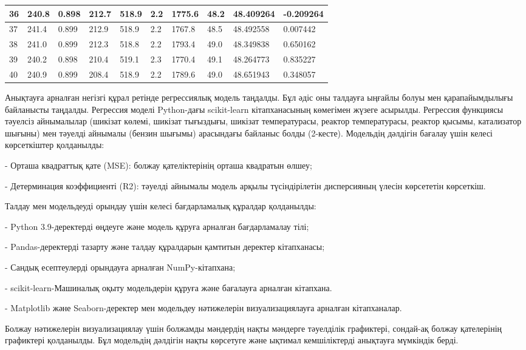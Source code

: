 \begin{longtable}[c]{|l|l|l|l|l|l|l|l|l|l|}
36 & 240.8 & 0.898 & 212.7 & 518.9 & 2.2  & 1775.6  & 48.2 & 48.409264 & -0.209264 \\ \hline
37 & 241.4 & 0.899 & 212.9 & 518.9 & 2.2  & 1767.8  & 48.5 & 48.492558 & 0.007442  \\ \hline
38 & 241.0 & 0.899 & 212.3 & 518.8 & 2.2  & 1793.4  & 49.0 & 48.349838 & 0.650162  \\ \hline
39 & 240.2 & 0.898 & 210.4 & 519.1 & 2.3  & 1770.4  & 49.1 & 48.264773 & 0.835227  \\ \hline
40 & 240.9 & 0.899 & 208.4 & 518.9 & 2.2  & 1789.6  & 49.0 & 48.651943 & 0.348057  \\ \hline
\end{longtable}

\begin{multicols}{2}
Анықтауға арналған негізгі құрал ретінде регрессиялық модель таңдалды.
Бұл әдіс оны талдауға ыңғайлы болуы мен қарапайымдылығы байланысты
таңдалды. Регрессия моделі Python-дағы scikit-learn кітапханасының
көмегімен жүзеге асырылды. Регрессия функциясы тәуелсіз айнымалылар
(шикізат көлемі, шикізат тығыздығы, шикізат температурасы, реактор
температурасы, реактор қысымы, катализатор шығыны) мен тәуелді айнымалы
(бензин шығымы) арасындағы байланыс болды (2-кесте). Модельдің дәлдігін
бағалау үшін келесі көрсеткіштер қолданылды:

- Орташа квадраттық қате (MSE): болжау қателіктерінің орташа квадратын
өлшеу;

- Детерминация коэффициенті (R2): тәуелді айнымалы модель арқылы
түсіндірілетін дисперсияның үлесін көрсететін көрсеткіш.

Талдау мен модельдеуді орындау үшін келесі бағдарламалық құралдар
қолданылды:

- Python 3.9-деректерді өңдеуге және модель құруға арналған
бағдарламалау тілі;

- Pandas-деректерді тазарту және талдау құралдарын қамтитын деректер
кітапханасы;

- Сандық есептеулерді орындауға арналған NumPy-кітапхана;

- scikit-learn-Машиналық оқыту модельдерін құруға және бағалауға
арналған кітапхана.

- Matplotlib және Seaborn-деректер мен модельдеу нәтижелерін
визуализациялауға арналған кітапханалар.

Болжау нәтижелерін визуализациялау үшін болжамды мәндердің нақты
мәндерге тәуелділік графиктері, сондай-ақ болжау қателерінің графиктері
қолданылды. Бұл модельдің дәлдігін нақты көрсетуге және ықтимал
кемшіліктерді анықтауға мүмкіндік берді.


\end{multicols}
